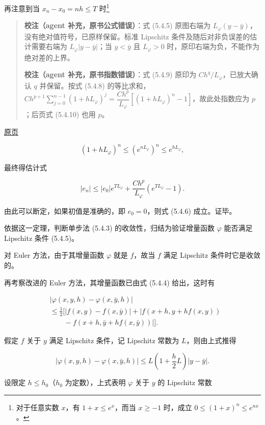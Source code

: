 \documentclass[
  10pt,
  fontset=fandol]{ctexart}
\begin{document}
再注意到当 \(x_n-x_0=nh\leqslant T\) 时\footnote{对于任意实数 \(x\)，有 \(1+x\leqslant e^x\)，而当 \(x\geqslant-1\) 时，成立 \(0\leqslant(1+x)^n\leqslant e^{nx}\)。}

\begin{quote}
\textbf{校注（agent 补充，原书公式错误）}：式 (5.4.5) 原图右端为 \(L_\varphi(y-\bar y)\)，没有绝对值符号，已原样保留。标准 Lipschitz 条件及随后对非负误差的估计需要右端为 \(L_\varphi|y-\bar y|\)；当 \(y<\bar y\) 且 \(L_\varphi>0\) 时，原印右端为负，不能作为绝对差的上界。

\textbf{校注（agent 补充，原书指数错误）}：式 (5.4.9) 原印为 \(Ch^q/L_\varphi\)，已放大确认 \(q\) 并保留。按式 (5.4.8) 的等比求和，\(Ch^{p+1}\sum_{j=0}^{n-1}(1+hL_\varphi)^j=\dfrac{Ch^p}{L_\varphi}[(1+hL_\varphi)^n-1]\)，故此处指数应为 \(p\)；后页式 (5.4.10) 也用 \(p\)。
\end{quote}

\href{../../source-images/pdf-135.jpeg}{原页}

\[
(1+hL_\varphi)^n\leqslant(e^{nL_\varphi})^n\leqslant e^{hL_\varphi},
\]

最终得估计式

\[
|e_n|\leqslant|e_0|e^{TL_\varphi}+\frac{Ch^p}{L_\varphi}(e^{TL_\varphi}-1).\tag{5.4.10}
\]

由此可以断定，如果初值是准确的，即 \(e_0=0\)，则式 (5.4.6) 成立。证毕。

依据这一定理，判断单步法 (5.4.3) 的收敛性，归结为验证增量函数 \(\varphi\) 能否满足 Lipschitz 条件 (5.4.5)。

对 Euler 方法，由于其增量函数 \(\varphi\) 就是 \(f\)，故当 \(f\) 满足 Lipschitz 条件时它是收敛的。

再考察改进的 Euler 方法，其增量函数已由式 (5.4.4) 给出，这时有

\[
\begin{aligned}
&|\varphi(x,y,h)-\varphi(x,\bar y,h)|\\
&\leqslant\frac12\bigl[|f(x,y)-f(x,\bar y)|+|f(x+h,y+hf(x,y))\\
&\qquad-f(x+h,\bar y+hf(x,\bar y))|\bigr].
\end{aligned}
\]

假定 \(f\) 关于 \(y\) 满足 Lipschitz 条件，记 Lipschitz 常数为 \(L\)，则由上式推得

\[
|\varphi(x,y,h)-\varphi(x,\bar y,h)|\leqslant L\left(1+\frac{h}{2}L\right)|y-\bar y|.
\]

设限定 \(h\leqslant h_0\)（\(h_0\) 为定数），上式表明 \(\varphi\) 关于 \(y\) 的 Lipschitz 常数
\end{document}
